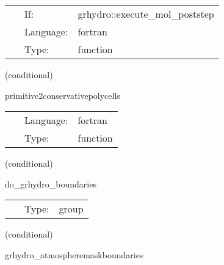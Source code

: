 \hspace{5mm}{\it convert back to primitive variables (polytype) } 


\hspace{5mm}

 \begin{tabular*}{160mm}{cll} 
~ & If:  & grhydro::execute\_mol\_poststep \\ 
~ & Language:  & fortran \\ 
~ & Type:  & function \\ 
\end{tabular*} 


\vspace{5mm}

   (conditional) 

\hspace{5mm} primitive2conservativepolycells 

\hspace{5mm}{\it convert initial data given in primive variables to conserved variables } 


\hspace{5mm}

 \begin{tabular*}{160mm}{cll} 
~ & Language:  & fortran \\ 
~ & Type:  & function \\ 
\end{tabular*} 


\vspace{5mm}

   (conditional) 

\hspace{5mm} do\_grhydro\_boundaries 

\hspace{5mm}{\it grhydro boundary conditions group } 


\hspace{5mm}

 \begin{tabular*}{160mm}{cll} 
~ & Type:  & group \\ 
\end{tabular*} 


\vspace{5mm}

   (conditional) 

\hspace{5mm} grhydro\_atmospheremaskboundaries 

